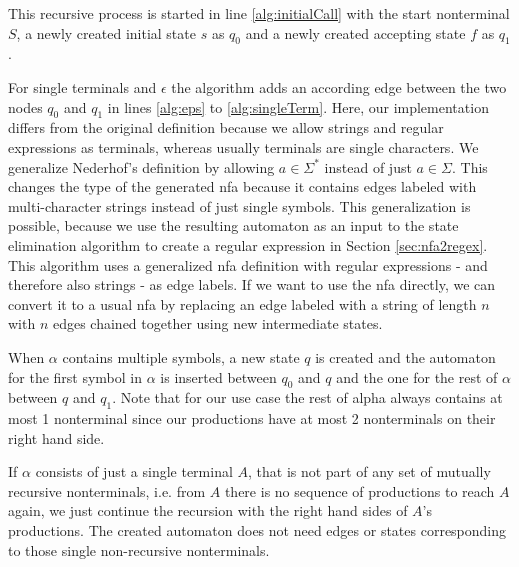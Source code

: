 This recursive process is started in line \ref{alg:initialCall} with the start nonterminal $S$, a newly created initial state $s$ as $q_0$ and a newly created accepting state $f$ as $q_1$.

For single terminals and $\epsilon$ the algorithm adds an according edge between the two nodes $q_0$ and $q_1$ in lines \ref{alg:eps} to \ref{alg:singleTerm}.
Here, our implementation differs from the original definition because we allow strings and regular expressions as terminals, whereas usually terminals are single characters. We generalize Nederhof's definition by allowing $a \in \Sigma^*$ instead of just $a \in \Sigma$.
This changes the type of the generated \ac{nfa} because it contains edges labeled with multi-character strings instead of just single symbols. This generalization is possible, because we use the resulting automaton as an input to the state elimination algorithm to create a regular expression in Section \ref{sec:nfa2regex}. This algorithm uses a generalized \ac{nfa} definition with regular expressions - and therefore also strings - as edge labels. If we want to use the \ac{nfa} directly, we can convert it to a usual \ac{nfa} by replacing an edge labeled with a string of length $n$ with $n$ edges chained together using new intermediate states.

When $\alpha$ contains multiple symbols, a new state $q$ is created and the automaton for the first symbol in $\alpha$ is inserted between $q_0$ and $q$ and the one for the rest of $\alpha$ between $q$ and $q_1$. Note that for our use case the rest of alpha always contains at most 1 nonterminal since our productions have at most 2 nonterminals on their right hand side.

If $\alpha$ consists of just a single terminal $A$, that is not part of any set of mutually recursive nonterminals, i.e. from $A$ there is no sequence of productions to reach $A$ again, we just continue the recursion with the right hand sides of $A$'s productions. The created automaton does not need edges or states corresponding to those single non-recursive nonterminals. 


